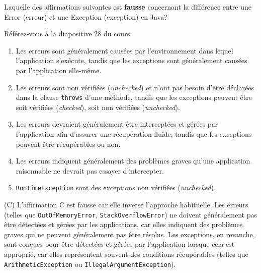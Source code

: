  \begin{Exercice}[5 minutes]
Laquelle des affirmations suivantes est \textbf{fausse} concernant la différence entre une Error (erreur) et une Exception (exception) en Java?
\begin{conseil}
    Référez-vous à la diapositive 28 du cours.
\end{conseil}
\begin{enumerate}[label=(\Alph*)]
    \item Les erreurs sont généralement causées par l'environnement dans lequel l'application s'exécute, tandis que les exceptions sont généralement causées par l'application elle-même.
    \item Les erreurs sont non vérifiées (\textit{unchecked}) et n'ont pas besoin d'être déclarées dans la clause \texttt{throws} d'une méthode, tandis que les exceptions peuvent être soit vérifiées (\textit{checked}), soit non vérifiées (\textit{unchecked}).
    \item Les erreurs devraient généralement être interceptées et gérées par l'application afin d'assurer une récupération fluide, tandis que les exceptions peuvent être récupérables ou non.
    \item Les erreurs indiquent généralement des problèmes graves qu'une application raisonnable ne devrait pas essayer d'intercepter.
    \item \texttt{RuntimeException} sont des exceptions non vérifiées (\textit{unchecked}).
\end{enumerate}

\begin{solution}
(C) L'affirmation C est fausse car elle inverse l'approche habituelle. 
Les erreurs (telles que \texttt{OutOfMemoryError}, \texttt{StackOverflowError}) ne doivent généralement pas 
être détectées et gérées par les applications, car elles indiquent des problèmes graves qui ne peuvent 
généralement pas être résolus. Les exceptions, en revanche, sont conçues pour être détectées et gérées par l'application lorsque cela est approprié, 
car elles représentent souvent des conditions récupérables (telles que \texttt{ArithmeticException} ou \texttt{IllegalArgumentException}).
\end{solution}
 \end{Exercice}


